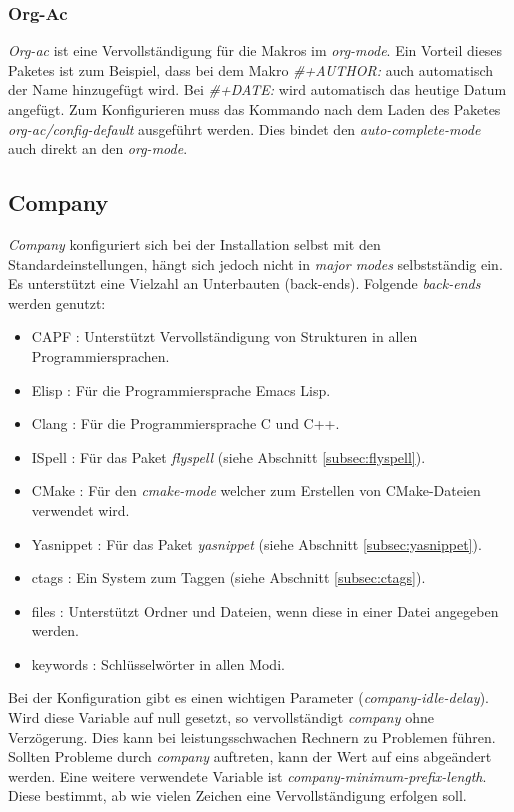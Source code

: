 \subsubsection{Org-Ac}
\label{subsubsec:orgac}
\textit{Org-ac} ist eine Vervollständigung für die Makros im
\textit{org-mode}. Ein Vorteil dieses Paketes ist zum Beispiel, dass
bei dem Makro \textit{\#+AUTHOR:} auch automatisch der Name
hinzugefügt wird. Bei \textit{\#+DATE:} wird automatisch das heutige
Datum angefügt. Zum Konfigurieren muss das Kommando nach dem Laden des
Paketes \textit{org-ac/config-default} ausgeführt werden. Dies bindet
den \textit{auto-complete-mode} auch direkt an den
\textit{org-mode}. \cite{OrgAC}\\

\subsection{Company}
\label{subsec:company}
\textit{Company} konfiguriert sich bei der Installation selbst mit den
Standardeinstellungen, hängt sich jedoch nicht in \textit{major modes}
selbstständig ein. Es unterstützt eine Vielzahl an Unterbauten
({\glqq}back-ends{\grqq}). Folgende \textit{back-ends} werden genutzt:
\begin{itemize}
\item CAPF : Unterstützt Vervollständigung von Strukturen in allen
  Programmiersprachen.
\item Elisp : Für die Programmiersprache Emacs Lisp.
\item Clang : Für die Programmiersprache C und C++.
\item ISpell : Für das Paket \textit{flyspell} (siehe Abschnitt
  \ref{subsec:flyspell}).
\item CMake : Für den \textit{cmake-mode} welcher zum Erstellen von
  CMake-Dateien verwendet wird.
\item Yasnippet : Für das Paket \textit{yasnippet} (siehe Abschnitt
  \ref{subsec:yasnippet}).
\item ctags : Ein System zum Taggen (siehe Abschnitt
  \ref{subsec:ctags}).
\item files : Unterstützt Ordner und Dateien, wenn diese in einer
  Datei angegeben werden.
\item keywords : Schlüsselwörter in allen Modi.\\
\end{itemize}
Bei der Konfiguration gibt es einen wichtigen Parameter
(\textit{company-idle-delay}). Wird diese Variable auf null gesetzt,
so vervollständigt \textit{company} ohne Verzögerung. Dies kann bei
leistungsschwachen Rechnern zu Problemen führen. Sollten Probleme
durch \textit{company} auftreten, kann der Wert auf eins abgeändert
werden. Eine weitere verwendete Variable ist
\textit{company-minimum-prefix-length}. Diese bestimmt, ab wie vielen
Zeichen eine Vervollständigung erfolgen soll. \cite{Company}\\

